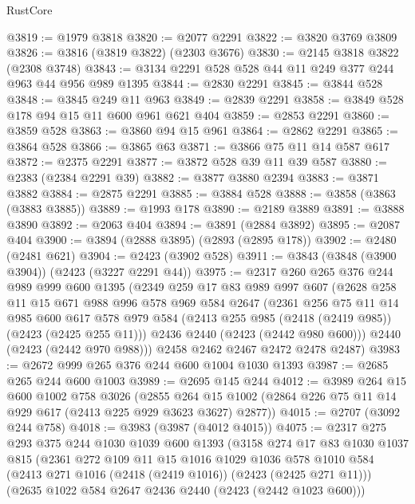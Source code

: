 \begin{lexlean}{RustCore}
\begin{coremodule}
@3819 := @1979 @3818
@3820 := @2077 @2291
@3822 := @3820 @3769 @3809
@3826 := @3816 (@3819 @3822) (@2303 @3676)
@3830 := @2145 @3818 @3822 (@2308 @3748)
@3843 := @3134 @2291 @528 @528 @44 @11 @249 @377 @244 @963 @44 @956 @989 @1395
@3844 := @2830 @2291
@3845 := @3844 @528
@3848 := @3845 @249 @11 @963
@3849 := @2839 @2291
@3858 := @3849 @528 @178 @94 @15 @11 @600 @961 @621 @404
@3859 := @2853 @2291
@3860 := @3859 @528
@3863 := @3860 @94 @15 @961
@3864 := @2862 @2291
@3865 := @3864 @528
@3866 := @3865 @63
@3871 := @3866 @75 @11 @14 @587 @617
@3872 := @2375 @2291
@3877 := @3872 @528 @39 @11 @39 @587
@3880 := @2383 (@2384 @2291 @39)
@3882 := @3877 @3880 @2394
@3883 := @3871 @3882
@3884 := @2875 @2291
@3885 := @3884 @528
@3888 := @3858 (@3863 (@3883 @3885))
@3889 := @1993 @178
@3890 := @2189 @3889
@3891 := @3888 @3890
@3892 := @2063 @404
@3894 := @3891 (@2884 @3892)
@3895 := @2087 @404
@3900 := @3894 (@2888 @3895) (@2893 (@2895 @178))
@3902 := @2480 (@2481 @621)
@3904 := @2423 (@3902 @528)
@3911 := @3843 (@3848 (@3900 @3904)) (@2423 (@3227 @2291 @44))
@3975 := @2317
    @260
    @265
    @376
    @244
    @989
    @999
    @600
    @1395
    (@2349
      @259
      @17
      @83
      @989
      @997
      @607
      (@2628
        @258
        @11
        @15
        @671
        @988
        @996
        @578
        @969
        @584
        @2647
        (@2361
          @256
          @75
          @11
          @14
          @985
          @600
          @617
          @578
          @979
          @584
          (@2413 @255 @985 (@2418 (@2419 @985)) (@2423 (@2425 @255 @11)))
          @2436
          @2440
          (@2423 (@2442 @980 @600)))
        @2440
        (@2423 (@2442 @970 @988)))
      @2458
      @2462
      @2467
      @2472
      @2478
      @2487)
@3983 := @2672 @999 @265 @376 @244 @600 @1004 @1030 @1393
@3987 := @2685 @265 @244 @600 @1003
@3989 := @2695 @145 @244
@4012 := @3989
    @264
    @15
    @600
    @1002
    @758
    @3026
    (@2855 @264 @15 @1002 (@2864 @226 @75 @11 @14 @929 @617 (@2413 @225 @929 @3623 @3627) @2877))
@4015 := @2707 (@3092 @244 @758)
@4018 := @3983 (@3987 (@4012 @4015))
@4075 := @2317
    @275
    @293
    @375
    @244
    @1030
    @1039
    @600
    @1393
    (@3158
      @274
      @17
      @83
      @1030
      @1037
      @815
      (@2361
        @272
        @109
        @11
        @15
        @1016
        @1029
        @1036
        @578
        @1010
        @584
        (@2413 @271 @1016 (@2418 (@2419 @1016)) (@2423 (@2425 @271 @11)))
        (@2635 @1022 @584 @2647 @2436 @2440 (@2423 (@2442 @1023 @600)))

\end{coremodule}
\end{lexlean}
